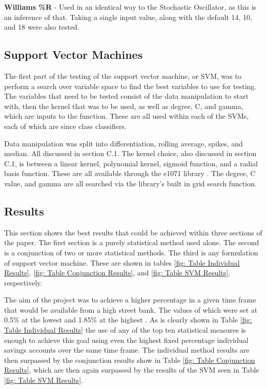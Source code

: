 \documentclass[conference]{IEEEtran}
\begin{document}
\textbf{Williams \%R} - Used in an identical way to the Stochastic Oscillator, as this is an inference of that. Taking a single input value, along with the default 14, 10, and 18 were also tested.

\subsection{Support Vector Machines}

The first part of the testing of the support vector machine, or SVM, was to perform a search over variable space to find the best variables to use for testing. The variables that need to be tested consist of the data manipulation to start with, then the kernel that was to be used, as well as degree, C, and gamma, which are inputs to the function. These are all used within each of the SVMs, each of which are since class classifiers. 

Data manipulation was split into differentiation, rolling average, spikes, and median. All discussed in section C.1. The kernel choice, also discussed in section C.1, is between a linear kernel, polynomial kernel, sigmoid function, and a radial basis function. These are all available through the e1071 library \cite{Meyer2017}. The degree, C value, and gamma are all searched via the library's built in grid search function. 

\subsection{Results}

This section shows the best results that could be achieved within three sections of the paper. The first section is a purely statistical method used alone. The second is a conjunction of two or more statistical methods. The third is any formulation of support vector machine. These are shown in tables \ref{fig: Table Individual Results}, \ref{fig: Table Conjunction Results}, and \ref{fig: Table SVM Results}, respectively.

The aim of the project was to achieve a higher percentage in a given time frame that would be available from a high street bank. The values of which were set at 0.5\% at the lowest \cite{BankofEngland2014} and 1.85\% at the highest \cite{Murray2018}. As is clearly shown in Table  \ref{fig: Table Individual Results} the use of any of the top ten statistical measures is enough to achieve this goal using even the highest fixed percentage individual savings accounts over the same time frame. The individual method results are then surpassed by the conjunction results show in Table \ref{fig: Table Conjunction Results}, which are then again surpassed by the results of the SVM seen in Table \ref{fig: Table SVM Results}.
\end{document}
